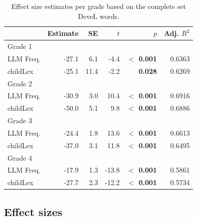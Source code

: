 \documentclass[doc, a4paper, anonymous]{apa7}
\begin{document}
\begin{table}[!htbp]
\caption{Effect size estimates per grade based on the complete set DeveL words.}
\centering
\begin{tabular}{lrrrrr}
  \hline
 & Estimate & SE & $t$ & $p$ & Adj. $R^2$   \\ 
  \hline
  Grade 1 \\ 
  LLM Freq. & -27.1 & 6.1 & -4.4 & \textbf{$<$ 0.001} & 0.6363 \\ 
  childLex & -25.1 & 11.4 & -2.2 & \textbf{0.028} & 0.6269\\ 
  Grade 2 \\ 
  LLM Freq. & -30.9 & 3.0 & 10.4 & \textbf{$<$ 0.001} & 0.6916 \\ 
  childLex & -50.0 & 5.1 & 9.8 & \textbf{$<$ 0.001} & 0.6886 \\ 
    Grade 3 \\ 
  LLM Freq. & -24.4 & 1.8 & 13.6 & \textbf{$<$ 0.001} & 0.6613 \\ 
  childLex & -37.0 & 3.1 & 11.8 & \textbf{$<$ 0.001} & 0.6495 \\ 
      Grade 4 \\ 
  LLM Freq. & -17.9 & 1.3 & -13.8 & \textbf{$<$ 0.001} & 0.5861 \\ 
  childLex & -27.7 & 2.3 & -12.2 & \textbf{$<$ 0.001} & 0.5734 \\ 
  \hline
\end{tabular}
\label{effsize}
\end{table}

\clearpage


\subsection{Effect sizes}
\end{document}
